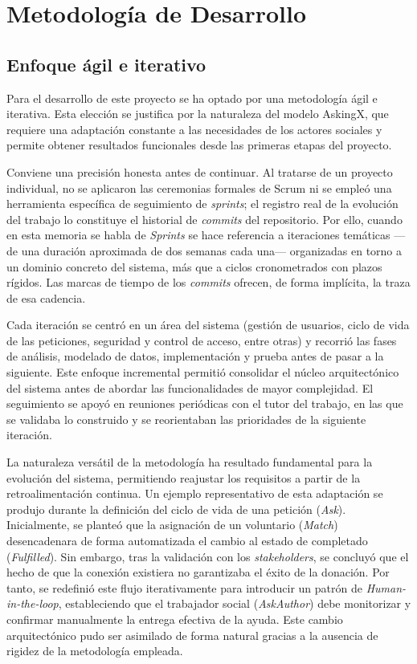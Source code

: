 \documentclass[11pt,oneside,spanish,listoffigures,listoftables]{tfgetsinf}
\begin{document}
\chapter{Metodología de Desarrollo}
\section{Enfoque ágil e iterativo}

Para el desarrollo de este proyecto se ha optado por una metodología ágil e iterativa. Esta elección se justifica por la naturaleza del modelo AskingX, que requiere una adaptación constante a las necesidades de los actores sociales y permite obtener resultados funcionales desde las primeras etapas del proyecto.

Conviene una precisión honesta antes de continuar. Al tratarse de un proyecto individual, no se aplicaron las ceremonias formales de Scrum ni se empleó una herramienta específica de seguimiento de \textit{sprints}; el registro real de la evolución del trabajo lo constituye el historial de \textit{commits} del repositorio. Por ello, cuando en esta memoria se habla de \textit{Sprints} se hace referencia a iteraciones temáticas —de una duración aproximada de dos semanas cada una— organizadas en torno a un dominio concreto del sistema, más que a ciclos cronometrados con plazos rígidos. Las marcas de tiempo de los \textit{commits} ofrecen, de forma implícita, la traza de esa cadencia.

Cada iteración se centró en un área del sistema (gestión de usuarios, ciclo de vida de las peticiones, seguridad y control de acceso, entre otras) y recorrió las fases de análisis, modelado de datos, implementación y prueba antes de pasar a la siguiente. Este enfoque incremental permitió consolidar el núcleo arquitectónico del sistema antes de abordar las funcionalidades de mayor complejidad. El seguimiento se apoyó en reuniones periódicas con el tutor del trabajo, en las que se validaba lo construido y se reorientaban las prioridades de la siguiente iteración.

La naturaleza versátil de la metodología ha resultado fundamental para la evolución del sistema, permitiendo reajustar los requisitos a partir de la retroalimentación continua. Un ejemplo representativo de esta adaptación se produjo durante la definición del ciclo de vida de una petición (\textit{Ask}). Inicialmente, se planteó que la asignación de un voluntario (\textit{Match}) desencadenara de forma automatizada el cambio al estado de completado (\textit{Fulfilled}). Sin embargo, tras la validación con los \textit{stakeholders}, se concluyó que el hecho de que la conexión existiera no garantizaba el éxito de la donación. Por tanto, se redefinió este flujo iterativamente para introducir un patrón de \textit{Human-in-the-loop}, estableciendo que el trabajador social (\textit{AskAuthor}) debe monitorizar y confirmar manualmente la entrega efectiva de la ayuda. Este cambio arquitectónico pudo ser asimilado de forma natural gracias a la ausencia de rigidez de la metodología empleada.
\end{document}
